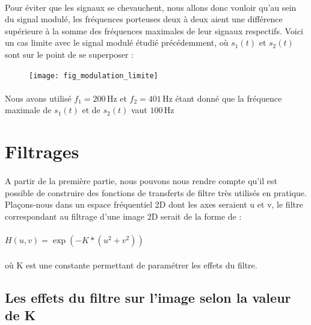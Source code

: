 \documentclass{article}
\begin{document}
\paragraph{}
Pour éviter que les signaux se chevauchent, nous allons donc vouloir qu'au sein du signal modulé, les fréquences porteuses deux à deux aient une différence supérieure à la somme des fréquences maximales de leur signaux respectifs.
\newpage
Voici un cas limite avec le signal modulé étudié précédemment, où $s_1(t)$ et $s_2(t)$ sont sur le point de se superposer :
\begin{figure}[h]
\texttt{[image: fig\_modulation\_limite]}
\centering
\end{figure}
\paragraph{}
Nous avons utilisé $f_1=200\,\mathrm{Hz}$ et $f_2=401\,\mathrm{Hz}$ étant donné que la fréquence maximale de $s_1(t)$ et de $s_2(t)$ vaut $100\,\mathrm{Hz}$

\section{Filtrages}
\paragraph{}
\justifying
A partir de la première partie, nous pouvons nous rendre compte qu'il est possible de construire des fonctions de transferts de filtre très utilisés en pratique. Plaçons-nous dans un espace fréquentiel 2D dont les axes seraient u et v, le filtre correspondant au filtrage d'une image 2D serait de la forme de :

\paragraph{}
\centering $H(u,v) = \exp(-K*(u^2+v^2))$
\paragraph{}
où K est une constante permettant de paramétrer les effets du filtre.

\subsection {Les effets du filtre sur l'image selon la valeur de K}
\end{document}
